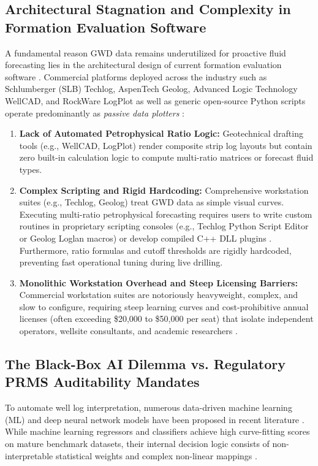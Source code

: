 \subsection{Architectural Stagnation and Complexity in Formation Evaluation Software}
A fundamental reason GWD data remains underutilized for proactive fluid forecasting lies in the architectural design of current formation evaluation software \citep{ref8, wood2020}. Commercial platforms deployed across the industry such as Schlumberger (SLB) Techlog, AspenTech Geolog, Advanced Logic Technology WellCAD, and RockWare LogPlot as well as generic open-source Python scripts operate predominantly as \textit{passive data plotters} \citep{wood2020}:
\begin{enumerate}
    \item \textbf{Lack of Automated Petrophysical Ratio Logic:} Geotechnical drafting tools (e.g., WellCAD, LogPlot) render composite strip log layouts but contain zero built-in calculation logic to compute multi-ratio matrices or forecast fluid types.
    \item \textbf{Complex Scripting and Rigid Hardcoding:} Comprehensive workstation suites (e.g., Techlog, Geolog) treat GWD data as simple visual curves. Executing multi-ratio petrophysical forecasting requires users to write custom routines in proprietary scripting consoles (e.g., Techlog Python Script Editor or Geolog Loglan macros) or develop compiled C++ DLL plugins \citep{wood2020}. Furthermore, ratio formulas and cutoff thresholds are rigidly hardcoded, preventing fast operational tuning during live drilling.
    \item \textbf{Monolithic Workstation Overhead and Steep Licensing Barriers:} Commercial workstation suites are notoriously heavyweight, complex, and slow to configure, requiring steep learning curves and cost-prohibitive annual licenses (often exceeding \$20,000 to \$50,000 per seat) that isolate independent operators, wellsite consultants, and academic researchers \citep{wood2020}.
\end{enumerate}

\subsection{The Black-Box AI Dilemma vs. Regulatory PRMS Auditability Mandates}
To automate well log interpretation, numerous data-driven machine learning (ML) and deep neural network models have been proposed in recent literature \citep{ref1, ref4, ref6}. While machine learning regressors and classifiers achieve high curve-fitting scores on mature benchmark datasets, their internal decision logic consists of non-interpretable statistical weights and complex non-linear mappings \citep{ref1}. 

